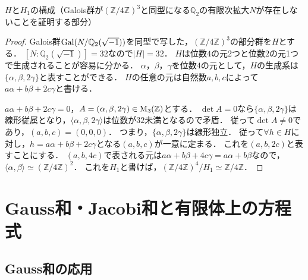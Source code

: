 \begin{screen}
  $H$と$H_1$の構成（Galois群が$(\mathbb{Z}/4\mathbb{Z})^3$と同型になる$\mathbb{Q}_2$の有限次拡大$N$が存在しないことを証明する部分）
\end{screen}
\begin{proof}
  Galois群$\operatorname{Gal}(N/\mathbb{Q}_2(\sqrt{-1}))$を同型で写した，$(\mathbb{Z}/4\mathbb{Z})^3$の部分群を$H$とする．
  $[N:\mathbb{Q}_2(\sqrt{-1})]=32$なので$\lvert H\rvert=32$．
  $H$は位数$4$の元2つと位数$2$の元1つで生成されることが容易に分かる．
  $\alpha$，$\beta$，$\gamma$を位数$4$の元として，$H$の生成系は$\{\alpha,\beta,2\gamma\}$と表すことができる．
  $H$の任意の元は自然数$a, b, c$によって$a\alpha+b\beta+2c\gamma$と書ける．

  $a\alpha+b\beta+2c\gamma=0$，$A=(\alpha,\beta,2\gamma)\in\operatorname{M}_3(\mathbb{Z})$とする．
  $\det A=0$なら$\{\alpha,\beta,2\gamma\}$は線形従属となり，$\langle\alpha,\beta,2\gamma\rangle$は位数が$32$未満となるので矛盾．
  従って$\det A\neq0$であり，$(a,b,c)=(0,0,0)$．
  つまり，$\{\alpha,\beta,2\gamma\}$は線形独立．
  従って$\forall h\in H$に対し，$h=a\alpha+b\beta+2c\gamma$となる$(a,b,c)$が一意に定まる．
  これを$(a,b,2c)$と表すことにする．
  $(a,b,4c)$で表される元は$a\alpha+b\beta+4c\gamma=a\alpha+b\beta$なので，$\langle\alpha,\beta\rangle\simeq(\mathbb{Z}/4\mathbb{Z})^2$．
  これを$H_1$と書けば，$(\mathbb{Z}/4\mathbb{Z})^4/H_1\simeq\mathbb{Z}/4\mathbb{Z}$．
\end{proof}

\chapter{Gauss和・Jacobi和と有限体上の方程式}
\setcounter{section}{1}
\section{Gauss和の応用}
